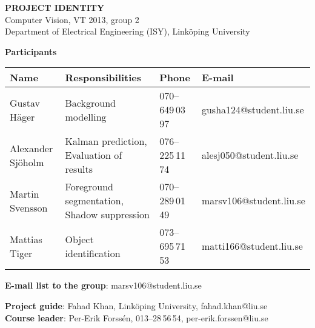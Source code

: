 \begin{center}
    \vspace*{4\baselineskip}

	\textbf{\huge PROJECT IDENTITY} \\
	\vspace*{0.5\baselineskip}
	Computer Vision, VT 2013, group 2 \\
	Department of Electrical Engineering (ISY), Link\"{o}ping University
	
	\vspace*{2\baselineskip}
	\textbf{\LARGE Participants}


	{\footnotesize 
	\begin{tabular}{|p{2.7cm}|p{5cm}|p{2cm}|p{3.4cm}|}
		\hline
			\textbf{Name} & \textbf{Responsibilities} & \textbf{Phone} & \textbf{E-mail} \\
		\hline
		Gustav Häger & Background modelling & 070--649\,03\,97 & gusha124@student.liu.se \\
		\hline
		Alexander Sjöholm & Kalman prediction, \newline Evaluation of results & 076--225\,11\,74 & alesj050@student.liu.se \\
		\hline
		Martin Svensson & Foreground segmentation, \newline Shadow suppression & 070--289\,01\,49 & marsv106@student.liu.se \\
		\hline
		Mattias Tiger & Object identification & 073--695\,71\,53 & matti166@student.liu.se \\
		\hline
	\end{tabular}
	}

{\footnotesize 
\textbf{E-mail list to the group}: marsv106@student.liu.se \\
\vspace{1\baselineskip}

\textbf{Project guide}: Fahad Khan, Link\"{o}ping University, fahad.khan@liu.se \\
\textbf{Course leader}: Per-Erik Forssén, 013--28\,56\,54, per-erik.forssen@liu.se \\
}

\end{center}
